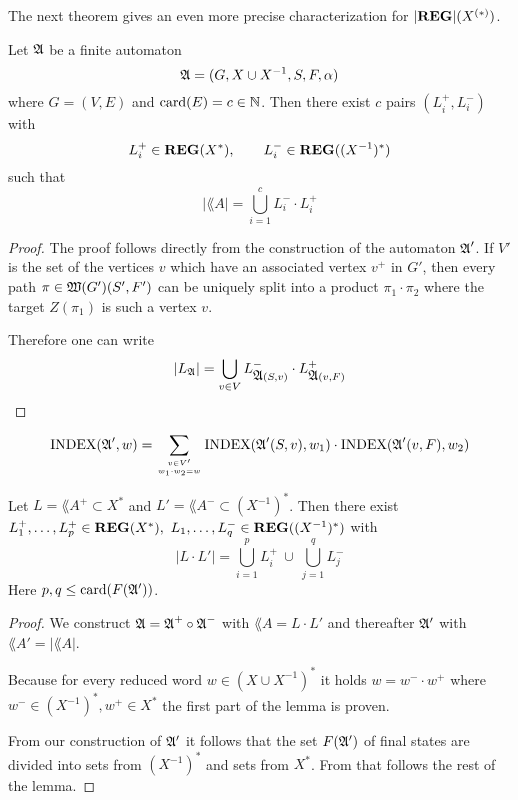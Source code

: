 The next theorem gives an even more precise characterization for
$|\mbox{{\bf REG}}|(\mbox{${X}^{(*)}$})$.

\begin{theorem}
Let $\mbox{$\mathfrak{A}$}$ be a finite automaton
\[ \mbox{$\mathfrak{A}$} = (G, X \cup {X}^{-1}, S, F, \alpha) \]
where $G = (V, E)$ and $\mathrm{card}(E) = c \in \mathbb{N}$. Then there exist $c$ pairs
$(L_i^+, L_i^-)$ with 
\[ L_i^+ \in \mbox{{\bf REG}}(X^*),\qquad L_i^- \in \mbox{{\bf REG}}((X^{-1})^*) \]
such that
\[ |\lang{A}| = \bigcup_{i=1}^c L_i^- \cdot L_i^+ \]
\end{theorem}

\begin{proof}
The proof follows directly from the construction of the automaton $\mbox{$\mathfrak{A}$}'$. If
$V'$ is the set of the vertices $v$ which have an associated vertex $v^+$ in
$G'$, then every path $\pi \in \mbox{$\mathfrak{W}(G')$}(S', F')$ can be uniquely split into
 a product $\pi_1 \cdot \pi_2$ where the target $Z(\pi_1)$ is such a vertex $v$.

Therefore one can write
\[ |\mbox{$L_{\mathfrak{A}}$}| = \bigcup_{v \in V} L_{\mbox{$\mathfrak{A}$}(S, v)}^- \cdot L_{\mbox{$\mathfrak{A}$}(v, F)}^+
\]
\end{proof}

\begin{corollary}
\[ \mathrm{INDEX}(\mbox{$\mathfrak{A}$}', w) = \sum_{v \in V' \atop w_1 \cdot w_2 = w}
\mathrm{INDEX}(\mbox{$\mathfrak{A}$}'(S, v), w_1) \cdot \mathrm{INDEX}(\mbox{$\mathfrak{A}$}'(v, F), w_2) \]
\end{corollary}

\begin{lemma}
Let $L = \lang{A}^+ \subset X^*$ and $L' = \lang{A}^- \subset (X^{-1})^*$. Then
there exist $L_1^+,\ldots,L_p^+ \in \mbox{{\bf REG}}(X^*),\ L_1,\ldots,L_q^- \in
\mbox{{\bf REG}}((X^{-1})^*)$ with
\[ |L \cdot L'| = \bigcup_{i=1}^{p} L_i^+ \ \cup\ \bigcup_{j=1}^{q} L_j^- \]
Here $p, q \leq \mathrm{card}(F(\mbox{$\mathfrak{A'}$}))$.
\end{lemma}

\begin{proof}
We construct $\mbox{$\mathfrak{A}$} = \mbox{$\mathfrak{A}$}^+ \circ \mbox{$\mathfrak{A}$}^-$ with $\lang{A} = L \cdot L'$ and
thereafter $\mbox{$\mathfrak{A'}$}$ with $\lang{A'} = |\lang{A}|$.

Because for every reduced word $w \in (X\cup X^{-1})^*$ it holds $w = w^- \cdot
w^+$ where $w^- \in (X^{-1})^*, w^+ \in X^*$ the first part of the lemma is
proven.

From our construction of $\mbox{$\mathfrak{A'}$}$ it follows that the set $F(\mbox{$\mathfrak{A'}$})$ of final
states are divided into sets from $(X^{-1})^*$ and sets from $X^*$. From that
follows the rest of the lemma.
\end{proof}

